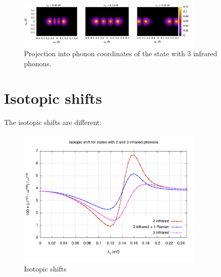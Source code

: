 \begin{figure}[ht!]
  \centering
  \includegraphics[width=0.8\textwidth]{images/ph-third_infrared.png}
  \caption{Projection into phonon coordinates of the state with 3 infrared phonons.}
  \label{fig:ph-third_infrared}
\end{figure}

\section{Isotopic shifts}

The isotopic shifts are different:

\begin{figure}[ht!]
  \centering
  \includegraphics[width=0.8\textwidth]{images/isot-2_3ir.jpg}
  \caption{Isotopic shifts}
  \label{fig:isot-2_3ir}
\end{figure}
